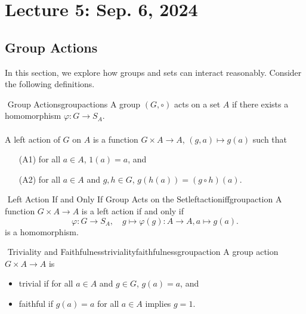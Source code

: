 \pagebreak

\section{Lecture 5: Sep. 6, 2024}

    \subsection{Group Actions}

        In this section, we explore how groups and sets can interact reasonably. Consider the following definitions.
        \begin{definition}{\Stop\,\,Group Actions}{groupactions}
            A group \((G,\circ)\) acts on a set \(A\) if there exists a homomorphism \(\varphi:G\to S_A\).
            \\
            \\
            A left action of \(G\) on \(A\) is a function \(G\times A\to A\), \((g,a)\mapsto g(a)\) such that
            \begin{enumerate}
                \item[(A1)] for all \(a\in A\), \(1(a)=a\), and
                \item[(A2)] for all \(a\in A\) and \(g,h\in G\), \(g(h(a))=(g\circ h)(a)\).
            \end{enumerate}
        \end{definition}
        \begin{proposition}{\Stop\,\,Left Action If and Only If Group Acts on the Set}{leftactioniffgroupaction}
            A function \(G\times A\to A\) is a left action if and only if
            \begin{equation*}
                \varphi:G\to S_A, \quad g\mapsto \varphi(g): A\to A, a\mapsto g(a).
            \end{equation*}
            is a homomorphism.
        \end{proposition}
        \begin{definition}{\Stop\,\,Triviality and Faithfulness}{trivialityfaithfulnessgroupaction}
            A group action \(G\times A\to A\) is
            \begin{itemize}
                \item trivial if for all \(a\in A\) and \(g\in G\), \(g(a)=a\), and
                \item faithful if \(g(a)=a\) for all \(a\in A\) implies \(g=1\).
            \end{itemize}
        \end{definition}
